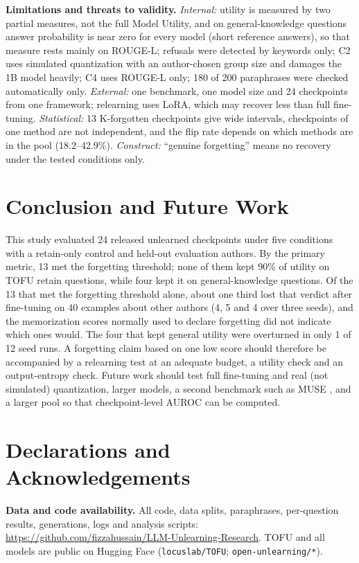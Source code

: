 \documentclass[conference]{IEEEtran}
\begin{document}
\textbf{Limitations and threats to validity.} \emph{Internal:} utility is measured by two partial measures, not the full Model Utility, and on general-knowledge questions answer probability is near zero for every model (short reference answers), so that measure rests mainly on ROUGE-L; refusals were detected by keywords only; C2 uses simulated quantization with an author-chosen group size and damages the 1B model heavily; C4 uses ROUGE-L only; 180 of 200 paraphrases were checked automatically only. \emph{External:} one benchmark, one model size and 24 checkpoints from one framework; relearning uses LoRA, which may recover less than full fine-tuning. \emph{Statistical:} 13 K-forgotten checkpoints give wide intervals, checkpoints of one method are not independent, and the flip rate depends on which methods are in the pool (18.2--42.9\%). \emph{Construct:} ``genuine forgetting'' means no recovery under the tested conditions only.

\section{Conclusion and Future Work}\label{sec:conclusion}
This study evaluated 24 released unlearned checkpoints under five conditions with a retain-only control and held-out evaluation authors. By the primary metric, 13 met the forgetting threshold; none of them kept 90\% of utility on TOFU retain questions, while four kept it on general-knowledge questions. Of the 13 that met the forgetting threshold alone, about one third lost that verdict after fine-tuning on 40 examples about other authors (4, 5 and 4 over three seeds), and the memorization scores normally used to declare forgetting did not indicate which ones would. The four that kept general utility were overturned in only 1 of 12 seed runs. A forgetting claim based on one low score should therefore be accompanied by a relearning test at an adequate budget, a utility check and an output-entropy check. Future work should test full fine-tuning and real (not simulated) quantization, larger models, a second benchmark such as MUSE \cite{shi2025muse}, and a larger pool so that checkpoint-level AUROC can be computed.

\section*{Declarations and Acknowledgements}
\textbf{Data and code availability.} All code, data splits, paraphrases, per-question results, generations, logs and analysis scripts: \url{https://github.com/fizzahussain/LLM-Unlearning-Research}. TOFU and all models are public on Hugging Face (\texttt{locuslab/TOFU}; \texttt{open-unlearning/*}).
\end{document}
